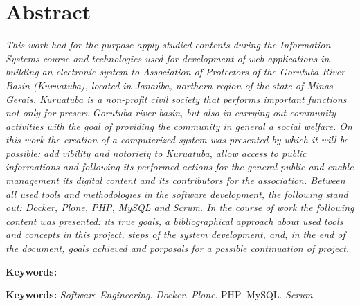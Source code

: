\chapter*{Abstract}
\vspace{0.4cm}
\noindent \textit{This work had for  the purpose apply studied contents during the Information Systems course and technologies  used for development of web applications   in building an electronic system to Association of Protectors of the Gorutuba River Basin (Kuruatuba), located in Janaúba, northern region of the state of Minas Gerais. 
Kuruatuba is a 
non-profit civil society that performs important functions not only for preserv Gorutuba river basin, but also in carrying out community activities with the goal of providing the community in general a social welfare.
On this work the creation of a computerized system was presented by which it will be possible: add vibility and notoriety to Kuruatuba, allow access to public informations and following its performed actions for the general public and enable management its digital content and its contributors for the association.
Between all used tools and methodologies in the software development, the following stand out: Docker, Plone, PHP, MySQL and Scrum.
In the course of work the following content was presented: its true goals, a bibliographical approach about used tools and concepts in this project, steps of the system development, and, in the end of the document, goals achieved and porposals for a possible continuation of project.}

\begin{labeling}{\textbf{Keywords:}}
\item[\textbf{Keywords:}] 
\textit{Software Engineering}.
\textit{Docker}.
\textit{Plone}.
PHP.
MySQL.
\textit{Scrum}.
\end{labeling}
